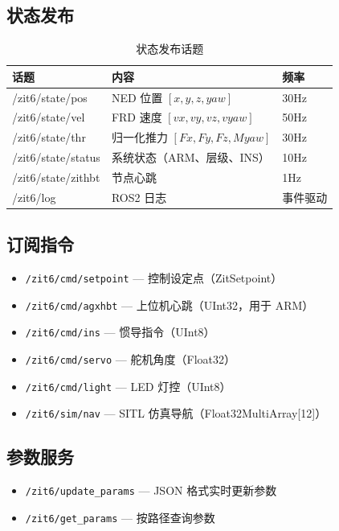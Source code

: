 \documentclass[12pt,a4paper]{article}
\begin{document}
\subsection{状态发布}

\begin{table}[H]
\centering
\begin{tabularx}{\textwidth}{lXl}
\toprule
\textbf{话题} & \textbf{内容} & \textbf{频率} \\
\midrule
/zit6/state/pos & NED 位置 $[x,y,z,yaw]$ & 30Hz \\
/zit6/state/vel & FRD 速度 $[vx,vy,vz,vyaw]$ & 50Hz \\
/zit6/state/thr & 归一化推力 $[Fx,Fy,Fz,Myaw]$ & 30Hz \\
/zit6/state/status & 系统状态（ARM、层级、INS） & 10Hz \\
/zit6/state/zithbt & 节点心跳 & 1Hz \\
/zit6/log & ROS2 日志 & 事件驱动 \\
\bottomrule
\end{tabularx}
\caption{状态发布话题}
\end{table}

\subsection{订阅指令}

\begin{itemize}
    \item \texttt{/zit6/cmd/setpoint} — 控制设定点（ZitSetpoint）
    \item \texttt{/zit6/cmd/agxhbt} — 上位机心跳（UInt32，用于 ARM）
    \item \texttt{/zit6/cmd/ins} — 惯导指令（UInt8）
    \item \texttt{/zit6/cmd/servo} — 舵机角度（Float32）
    \item \texttt{/zit6/cmd/light} — LED 灯控（UInt8）
    \item \texttt{/zit6/sim/nav} — SITL 仿真导航（Float32MultiArray[12]）
\end{itemize}

\subsection{参数服务}

\begin{itemize}
    \item \texttt{/zit6/update\_params} — JSON 格式实时更新参数
    \item \texttt{/zit6/get\_params} — 按路径查询参数
\end{itemize}
\end{document}
